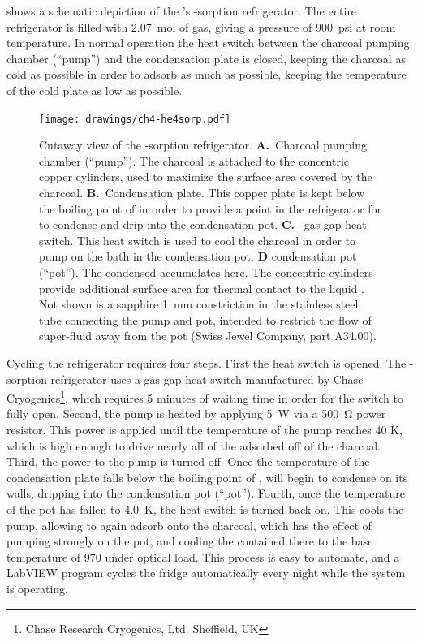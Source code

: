  shows a schematic depiction of the \Imager's -sorption refrigerator.
The entire refrigerator is filled with \SI{2.07}{\mole} of  gas, giving a pressure of \SI{900}{psi} at room temperature.
In normal operation the heat switch between the charcoal pumping chamber (``pump'') and the  condensation plate is closed, keeping the charcoal as cold as possible in order to adsorb as much  as possible, keeping the temperature of the cold plate as low as possible.

\begin{figure}
\centering
\texttt{[image: drawings/ch4-he4sorp.pdf]}
\caption[Cutaway view of the -sorption refrigerator]{
  Cutaway view of the -sorption refrigerator.
  \textbf{A.}\ Charcoal pumping chamber (``pump'').
  The charcoal is attached to the concentric copper cylinders, used to maximize the surface area covered by the charcoal.
  \textbf{B.}\ Condensation plate.
  This copper plate is kept below the boiling point of  in order to provide a point in the refrigerator for  to condense and drip into the condensation pot.
  \textbf{C.}\  gas gap heat switch.
  This heat switch is used to cool the charcoal in order to pump on the  bath in the condensation pot. \textbf{D}  condensation pot (``pot'').
  The condensed  accumulates here.
  The concentric cylinders provide additional surface area for thermal contact to the liquid .
  Not shown is a sapphire \SI{1}{\mm} constriction in the stainless steel tube connecting the pump and pot, intended to restrict the flow of super-fluid  away from the pot (Swiss Jewel Company, part A34.00).
}
\label{fig:he4sorp}
\end{figure}

Cycling the refrigerator requires four steps.
First the heat switch is opened.
The -sorption refrigerator uses a  gas-gap heat switch manufactured by Chase Cryogenics\footnote{Chase Research Cryogenics, Ltd. Sheffield, UK}, which requires 5 minutes of waiting time in order for the switch to fully open.
Second, the pump is heated by applying \SI{5}{\W} via a \SI{500}{\ohm} power resistor.
This power is applied until the temperature of the pump reaches 40 K, which is high enough to drive nearly all of the adsorbed  off of the charcoal.
Third, the power to the pump is turned off.
Once the temperature of the condensation plate falls below the boiling point of ,  will begin to condense on its walls, dripping into the  condensation pot (``pot'').
Fourth, once the temperature of the pot has fallen to \SI{4.0}{\K}, the heat switch is turned back on.
This cools the pump, allowing  to again adsorb onto the charcoal, which has the effect of pumping strongly on the pot, and cooling the  contained there to the base temperature of \SI{970}{\mK} under optical load.
This process is easy to automate, and a LabVIEW program cycles the fridge automatically every night while the system is operating.

